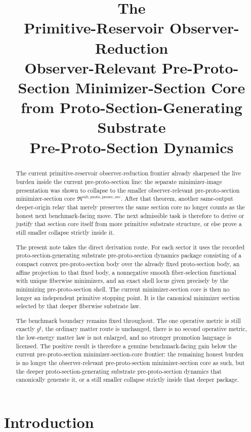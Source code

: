 \documentclass[11pt]{article}
\title{\textbf{The \TheoryName{}}\\[0.4em]
\large Primitive-Reservoir Observer-Reduction\\
\large Observer-Relevant Pre-Proto-Section Minimizer-Section Core\\
\large from Proto-Section-Generating Substrate\\
\large Pre-Proto-Section Dynamics}
\author{}
\date{}
\newcommand{\CompletedMetric}{g^{\sharp}}
\newcommand{\PreProtoSectionMinSectionCore}{\mathfrak R^{\mathrm{sub,proto,presec,sec}}}
\begin{document}
\maketitle

\begin{abstract}
The current primitive-reservoir observer-reduction frontier already sharpened the live burden inside the current pre-proto-section line: the separate minimizer-image presentation was shown to collapse to the smaller observer-relevant pre-proto-section minimizer-section core \(\PreProtoSectionMinSectionCore\). After that theorem, another same-output deeper-origin relay that merely preserves the same section core no longer counts as the honest next benchmark-facing move. The next admissible task is therefore to derive or justify that section core itself from more primitive substrate structure, or else prove a still smaller collapse strictly inside it.

The present note takes the direct derivation route. For each sector it uses the recorded proto-section-generating substrate pre-proto-section dynamics package consisting of a compact convex pre-proto-section body over the already fixed proto-section body, an affine projection to that fixed body, a nonnegative smooth fiber-selection functional with unique fiberwise minimizers, and an exact shell locus given precisely by the minimizing pre-proto-section shell. The current minimizer-section core is then no longer an independent primitive stopping point. It is the canonical minimizer section selected by that deeper fiberwise substrate law.

The benchmark boundary remains fixed throughout. The one operative metric is still exactly \(\CompletedMetric\), the ordinary matter route is unchanged, there is no second operative metric, the low-energy matter law is not enlarged, and no stronger promotion language is licensed. The positive result is therefore a genuine benchmark-facing gain below the current pre-proto-section minimizer-section-core frontier: the remaining honest burden is no longer the observer-relevant pre-proto-section minimizer-section core as such, but the deeper proto-section-generating substrate pre-proto-section dynamics that canonically generate it, or a still smaller collapse strictly inside that deeper package.
\end{abstract}

\section{Introduction}
\end{document}
